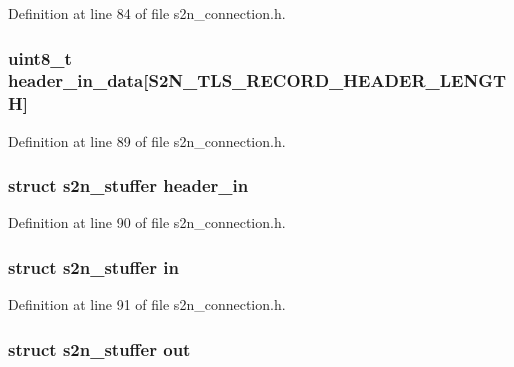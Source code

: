 Definition at line 84 of file s2n\+\_\+connection.\+h.

\subsubsection[{\texorpdfstring{header\+\_\+in\+\_\+data}{header_in_data}}]{\setlength{\rightskip}{0pt plus 5cm}uint8\+\_\+t header\+\_\+in\+\_\+data\mbox{[}{\bf S2\+N\+\_\+\+T\+L\+S\+\_\+\+R\+E\+C\+O\+R\+D\+\_\+\+H\+E\+A\+D\+E\+R\+\_\+\+L\+E\+N\+G\+TH}\mbox{]}}\hypertarget{structs2n__connection_a98a290bc914c8d1551b72c3eac121b65}{}\label{structs2n__connection_a98a290bc914c8d1551b72c3eac121b65}


Definition at line 89 of file s2n\+\_\+connection.\+h.

\subsubsection[{\texorpdfstring{header\+\_\+in}{header_in}}]{\setlength{\rightskip}{0pt plus 5cm}struct {\bf s2n\+\_\+stuffer} header\+\_\+in}\hypertarget{structs2n__connection_a005c1df7387f2c53061e9c9432f70aca}{}\label{structs2n__connection_a005c1df7387f2c53061e9c9432f70aca}


Definition at line 90 of file s2n\+\_\+connection.\+h.

\subsubsection[{\texorpdfstring{in}{in}}]{\setlength{\rightskip}{0pt plus 5cm}struct {\bf s2n\+\_\+stuffer} in}\hypertarget{structs2n__connection_a556c2665a42d6fd91dd28fc73d50d21e}{}\label{structs2n__connection_a556c2665a42d6fd91dd28fc73d50d21e}


Definition at line 91 of file s2n\+\_\+connection.\+h.

\subsubsection[{\texorpdfstring{out}{out}}]{\setlength{\rightskip}{0pt plus 5cm}struct {\bf s2n\+\_\+stuffer} out}\hypertarget{structs2n__connection_aa4edd9e7ae7d0068c43a8c3d54073da0}{}\label{structs2n__connection_aa4edd9e7ae7d0068c43a8c3d54073da0}


